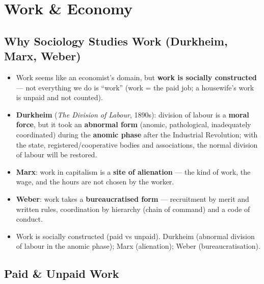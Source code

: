 \sectiondivider

\section{Work \& Economy}

\subsection{Why Sociology Studies Work (Durkheim, Marx, Weber)}

\begin{KeyConcept}
\begin{itemize}
    \item Work seems like an economist's domain, but \textbf{work is socially constructed} --- not everything we do is ``work'' (work = the paid job; a housewife's work is unpaid and not counted).
    \item \textbf{Durkheim} (\textit{The Division of Labour}, 1890s): division of labour is a \textbf{moral force}, but it took an \textbf{abnormal form} (anomic, pathological, inadequately coordinated) during the \textbf{anomic phase} after the Industrial Revolution; with the state, registered/cooperative bodies and associations, the normal division of labour will be restored.
    \item \textbf{Marx}: work in capitalism is a \textbf{site of alienation} --- the kind of work, the wage, and the hours are not chosen by the worker.
    \item \textbf{Weber}: work takes a \textbf{bureaucratised form} --- recruitment by merit and written rules, coordination by hierarchy (chain of command) and a code of conduct.
\end{itemize}
\end{KeyConcept}

\begin{QuickRevision}
\begin{itemize}
    \item Work is socially constructed (paid vs unpaid). Durkheim (abnormal division of labour in the anomic phase); Marx (alienation); Weber (bureaucratisation).
\end{itemize}
\end{QuickRevision}

\sectiondivider

\subsection{Paid \& Unpaid Work}

